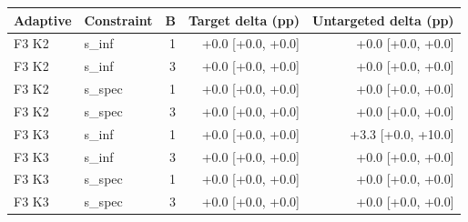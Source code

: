 \begin{tabular}{llrrr}
\toprule
Adaptive & Constraint & B & Target delta (pp) & Untargeted delta (pp) \\
\midrule
F3 K2 & s\_inf & 1 & +0.0 [+0.0, +0.0] & +0.0 [+0.0, +0.0] \\
F3 K2 & s\_inf & 3 & +0.0 [+0.0, +0.0] & +0.0 [+0.0, +0.0] \\
F3 K2 & s\_spec & 1 & +0.0 [+0.0, +0.0] & +0.0 [+0.0, +0.0] \\
F3 K2 & s\_spec & 3 & +0.0 [+0.0, +0.0] & +0.0 [+0.0, +0.0] \\
F3 K3 & s\_inf & 1 & +0.0 [+0.0, +0.0] & +3.3 [+0.0, +10.0] \\
F3 K3 & s\_inf & 3 & +0.0 [+0.0, +0.0] & +0.0 [+0.0, +0.0] \\
F3 K3 & s\_spec & 1 & +0.0 [+0.0, +0.0] & +0.0 [+0.0, +0.0] \\
F3 K3 & s\_spec & 3 & +0.0 [+0.0, +0.0] & +0.0 [+0.0, +0.0] \\
\bottomrule
\end{tabular}
